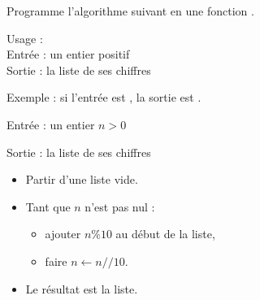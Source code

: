 \documentclass[11pt,class=report,crop=false]{standalone}
\begin{document}


\begin{activite}


Programme l'algorithme suivant en une fonction .

 
   \begin{fonction}
  Usage :  \\
  Entrée : un entier positif \\
  Sortie : la liste de ses chiffres
  
  \medskip
    
  Exemple : si l'entrée est , la sortie est \ci{[1,2,3,4]}.
  \end{fonction}


  \begin{algorithme}
  Entrée : un entier $n>0$

  Sortie : la liste de ses chiffres 

  \begin{itemize}
    \item Partir d'une liste vide.
    
    \item Tant que $n$ n'est pas nul :
    
     \begin{itemize} 
       \item ajouter $n \% 10$ au début de la liste,
       \item faire $n \leftarrow n//10$.
     \end{itemize}    
         
    \item Le résultat est la liste.
  \end{itemize} 
             
 \end{algorithme}
 
  

\end{activite}
\end{document}
